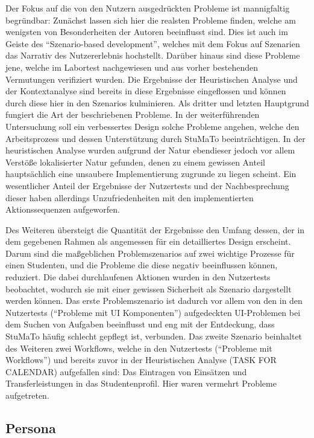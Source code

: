 \documentclass[
  12pt,
  ngerman,
  a4paper,
]{article}
\begin{document}
Der Fokus auf die von den Nutzern ausgedrückten Probleme ist
mannigfaltig begründbar: Zunächst lassen sich hier die realsten Probleme
finden, welche am wenigsten von Besonderheiten der Autoren beeinflusst
sind. Dies ist auch im Geiste des ``Szenario-based development'',
welches mit dem Fokus auf Szenarien das Narrativ des Nutzererlebnis
hochstellt. Darüber hinaus sind diese Probleme jene, welche im Labortest
nachgewiesen und aus vorher bestehenden Vermutungen verifiziert wurden.
Die Ergebnisse der Heuristischen Analyse und der Kontextanalyse sind
bereits in diese Ergebnisse eingeflossen und können durch diese hier in
den Szenarios kulminieren. Als dritter und letzten Hauptgrund fungiert
die Art der beschriebenen Probleme. In der weiterführenden Untersuchung
soll ein verbessertes Design solche Probleme angehen, welche den
Arbeitsprozess und dessen Unterstützung durch StuMaTo beeinträchtigen.
In der heuristischen Analyse wurden aufgrund der Natur ebendieser jedoch
vor allem Verstöße lokalisierter Natur gefunden, denen zu einem gewissen
Anteil hauptsächlich eine unsaubere Implementierung zugrunde zu liegen
scheint. Ein wesentlicher Anteil der Ergebnisse der Nutzertests und der
Nachbesprechung dieser haben allerdings Unzufriedenheiten mit den
implementierten Aktionssequenzen aufgeworfen.

Des Weiteren übersteigt die Quantität der Ergebnisse den Umfang dessen,
der in dem gegebenen Rahmen als angemessen für ein detailliertes Design
erscheint. Darum sind die maßgeblichen Problemszenarios auf zwei
wichtige Prozesse für einen Studenten, und die Probleme die diese
negativ beeinflussen können, reduziert. Die dabei durchlaufenen Aktionen
wurden in den Nutzertests beobachtet, wodurch sie mit einer gewissen
Sicherheit als Szenario dargestellt werden können. Das erste
Problemszenario ist dadurch vor allem von den in den Nutzertests
(``Probleme mit UI Komponenten'') aufgedeckten UI-Problemen bei dem
Suchen von Aufgaben beeinflusst und eng mit der Entdeckung, dass StuMaTo
häufig schlecht gepflegt ist, verbunden. Das zweite Szenario beinhaltet
des Weiteren zwei Workflows, welche in den Nutzertests (``Probleme mit
Workflows'') und bereits zuvor in der Heuristischen Analyse (TASK FOR
CALENDAR) aufgefallen sind: Das Eintragen von Einsätzen und
Transferleistungen in das Studentenprofil. Hier waren vermehrt Probleme
aufgetreten.

\hypertarget{persona}{%
\subsection{Persona}\label{persona}}
\end{document}
